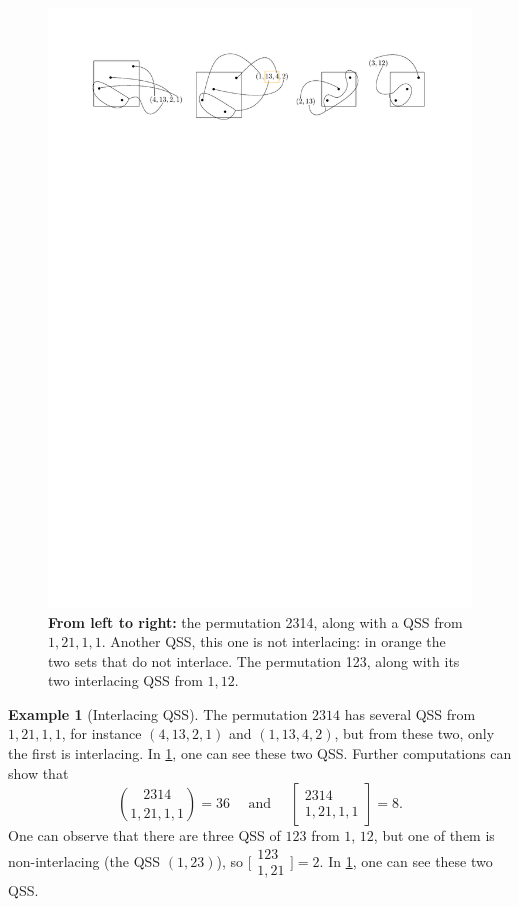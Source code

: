 \documentclass[submission]{FPSAC2023}
\theoremstyle{definition}
\newtheorem{smpl}[thm]{Example}
\begin{document}
\begin{figure}[h]
    \centering
    \includegraphics[scale=1]{../images/interlacing_25314.pdf}
    \caption{\textbf{From left to right:} the permutation 2314, along with a QSS from $1, 21, 1, 1$. Another QSS, this one is not interlacing: in orange the two sets that do not interlace. The permutation 123, along with its two interlacing QSS from $1, 12$.\label{fig:interlacingQSSsmpl}}
\end{figure}
\begin{smpl}[Interlacing QSS]
The permutation $2314$ has several QSS from $1, 21, 1, 1$, for instance $(4, 13, 2, 1)$ and $(1, 13, 4, 2)$, but from these two, only the first is interlacing.
In \cref{fig:interlacingQSSsmpl}, one can see these two QSS.
Further computations can show that
\[\binom{2314}{1, 21, 1, 1} = 36 \quad \text{ and } \quad \begin{bmatrix}
2314 \\ 1, 21, 1, 1
\end{bmatrix} = 8.\]
One can observe that there are three QSS of $123$ from $1$, $12$, but one of them is non-interlacing (the QSS $(1,23)$), so
$\bigl[\!\begin{smallmatrix} 123 \\ 1, 21 \end{smallmatrix}\!\bigr] = 2$.
In \cref{fig:interlacingQSSsmpl}, one can see these two QSS.
\end{smpl}
\end{document}
